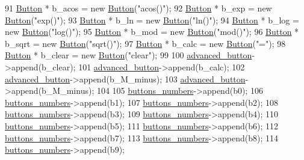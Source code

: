 \begin{DoxyCode}
91     \hyperlink{classButton}{Button} * b\_acos    = \textcolor{keyword}{new}  \hyperlink{classButton}{Button}(\textcolor{stringliteral}{"acos()"});
92     \hyperlink{classButton}{Button} * b\_exp     = \textcolor{keyword}{new}  \hyperlink{classButton}{Button}(\textcolor{stringliteral}{"exp()"});
93     \hyperlink{classButton}{Button} * b\_ln      = \textcolor{keyword}{new}  \hyperlink{classButton}{Button}(\textcolor{stringliteral}{"ln()"});
94     \hyperlink{classButton}{Button} * b\_log     = \textcolor{keyword}{new}  \hyperlink{classButton}{Button}(\textcolor{stringliteral}{"log()"});
95     \hyperlink{classButton}{Button} * b\_mod     = \textcolor{keyword}{new}  \hyperlink{classButton}{Button}(\textcolor{stringliteral}{"mod()"});
96     \hyperlink{classButton}{Button} * b\_sqrt    = \textcolor{keyword}{new}  \hyperlink{classButton}{Button}(\textcolor{stringliteral}{"sqrt()"});
97     \hyperlink{classButton}{Button} * b\_calc    = \textcolor{keyword}{new}  \hyperlink{classButton}{Button}(\textcolor{stringliteral}{"="});
98     \hyperlink{classButton}{Button} * b\_clear    = \textcolor{keyword}{new}  \hyperlink{classButton}{Button}(\textcolor{stringliteral}{"clear"});
99 
100     \hyperlink{classControl_a411ed3a73de2c83535ce4d2b44b91ace}{advanced\_button}->append(b\_clear);
101     \hyperlink{classControl_a411ed3a73de2c83535ce4d2b44b91ace}{advanced\_button}->append(b\_calc);
102     \hyperlink{classControl_a411ed3a73de2c83535ce4d2b44b91ace}{advanced\_button}->append(b\_M\_minus);
103     \hyperlink{classControl_a411ed3a73de2c83535ce4d2b44b91ace}{advanced\_button}->append(b\_M\_minus);
104 
105     \hyperlink{classControl_a1675f42401d90e37e0273f991c6886b6}{buttons\_numbers}->append(b0);
106     \hyperlink{classControl_a1675f42401d90e37e0273f991c6886b6}{buttons\_numbers}->append(b1);
107     \hyperlink{classControl_a1675f42401d90e37e0273f991c6886b6}{buttons\_numbers}->append(b2);
108     \hyperlink{classControl_a1675f42401d90e37e0273f991c6886b6}{buttons\_numbers}->append(b3);
109     \hyperlink{classControl_a1675f42401d90e37e0273f991c6886b6}{buttons\_numbers}->append(b4);
110     \hyperlink{classControl_a1675f42401d90e37e0273f991c6886b6}{buttons\_numbers}->append(b5);
111     \hyperlink{classControl_a1675f42401d90e37e0273f991c6886b6}{buttons\_numbers}->append(b6);
112     \hyperlink{classControl_a1675f42401d90e37e0273f991c6886b6}{buttons\_numbers}->append(b7);
113     \hyperlink{classControl_a1675f42401d90e37e0273f991c6886b6}{buttons\_numbers}->append(b8);
114     \hyperlink{classControl_a1675f42401d90e37e0273f991c6886b6}{buttons\_numbers}->append(b9);

\end{DoxyCode}
